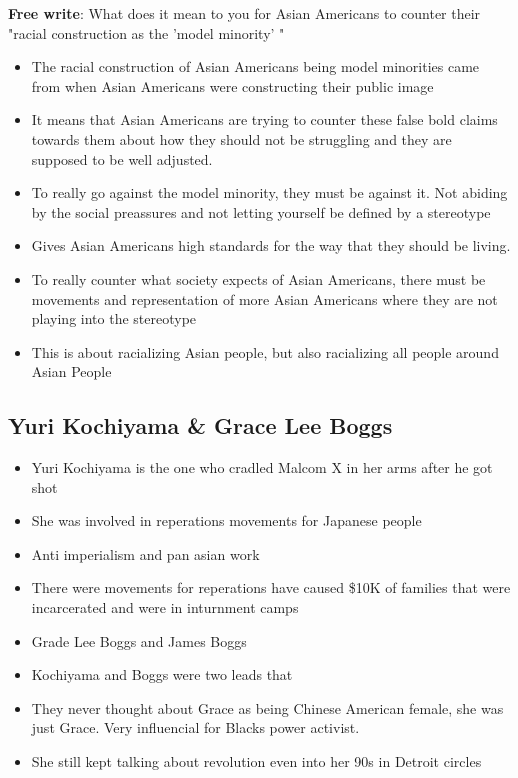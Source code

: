 \documentclass{article}
\begin{document}
    \textbf{Free write}: What does it mean to you for Asian Americans
    to counter their "racial construction as the 'model minority' "
\begin{itemize}
  \item The racial construction of Asian Americans being model minorities came from
    when Asian Americans were constructing their public image
  \item It means that Asian Americans are trying to counter these false bold claims
    towards them about how they should not be struggling and they are supposed
    to be well adjusted.
  \item To really go against the model minority, they must be against it.
    Not abiding by the social preassures and not letting yourself be defined
    by a stereotype
  \item Gives Asian Americans high standards for the way that they should be living.
  \item To really counter what society expects of Asian Americans, there must be
    movements and representation of more Asian Americans where they are not
    playing into the stereotype
  \item This is about racializing Asian people, but also racializing all people
    around Asian People
\end{itemize}

\subsection{Yuri Kochiyama \& Grace Lee Boggs}
\begin{itemize}
  \item Yuri Kochiyama is the one who cradled Malcom X in her arms
    after he got shot
  \item She was involved in reperations movements for Japanese people
  \item Anti imperialism and pan asian work
  \item There were movements for reperations have caused \$10K of families that were incarcerated
    and were in inturnment camps
  \item Grade Lee Boggs and James Boggs
  \item Kochiyama and Boggs were two leads that
  \item They never thought about Grace as being Chinese American female,
    she was just Grace. Very influencial for Blacks power activist.
  \item She still kept talking about revolution even into her 90s
    in Detroit circles
\end{itemize}
\end{document}
